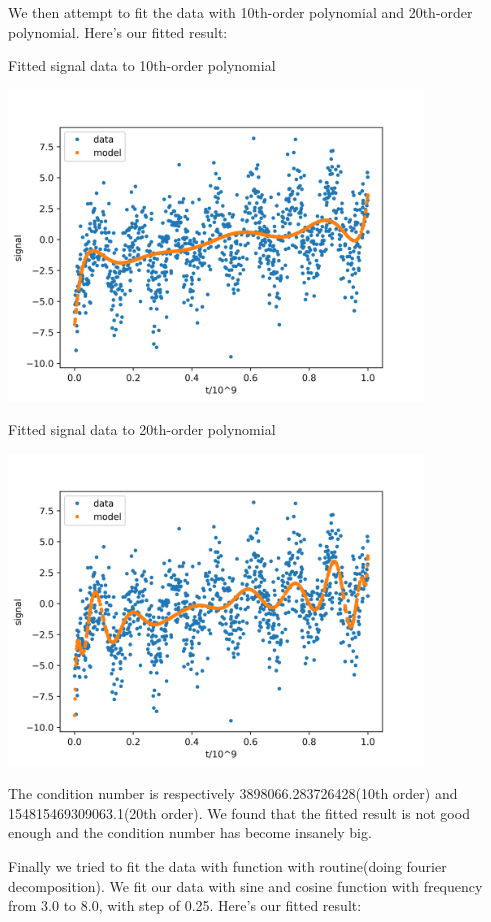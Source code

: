 \documentclass[letterpaper,12pt]{article}
\begin{document}
We then attempt to fit the data with 10th-order polynomial and 20th-order polynomial. Here's our fitted result:

\begin{table}[!h]
    \centering
    \caption{Fitted signal data to 10th-order polynomial}
    \includegraphics[width=11cm]{ps5-3-4-10.png}
\end{table}%

\begin{table}[!h]
    \centering
    \caption{Fitted signal data to 20th-order polynomial}
    \includegraphics[width=11cm]{ps5-3-4-20.png}
\end{table}%

\newpage

The condition number is respectively 3898066.283726428(10th order) and 154815469309063.1(20th order). We found that the fitted result is not good enough and the condition number has become insanely big.

Finally we tried to fit the data with function with routine(doing fourier decomposition). We fit our data with sine and cosine function with frequency from 3.0 to 8.0, with step of 0.25. Here's our fitted result:
\end{document}

